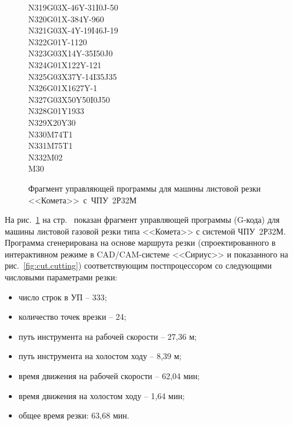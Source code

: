 \begin{figure}
\begin{multicols}{3}
    N319G03X-46Y-31I0J-50 \\
    N320G01X-384Y-960 \\
    N321G03X-4Y-19I46J-19 \\
    N322G01Y-1120 \\
    N323G03X14Y-35I50J0 \\
    N324G01X122Y-121  \\
    N325G03X37Y-14I35J35  \\
    N326G01X1627Y-1 \\
    N327G03X50Y50I0J50  \\
    N328G01Y1933  \\
    N329X20Y30  \\
    N330M74T1 \\
    N331M75T1 \\
    N332M02 \\
    M30
  \end{multicols}
  \caption{
    Фрагмент управляющей программы
    для машины листовой резки <<Комета>>~с~ЧПУ~2Р32М
  }
  \label{fig:cut.control-program}
\end{figure}

На рис.~\ref{fig:cut.control-program}
на стр.~\pageref{fig:cut.control-program}
показан фрагмент управляющей программы
(G-кода) для машины листовой газовой резки
типа <<Комета>> с системой ЧПУ~2Р32М.
Программа сгенерирована на основе маршрута резки
(спроектированного в интерактивном режиме в
CAD/CAM-системе <<Сириус>>
и показанного на рис.~\ref{fig:cut.cutting})
соответствующим постпроцессором со
следующими числовыми параметрами резки:
\begin{itemize}
  \item	число строк в УП – 333;
  \item	количество точек врезки – 24;
  \item	путь инструмента на рабочей скорости – 27,36 м;
  \item	путь инструмента на холостом ходу – 8,39 м;
  \item	время движения на рабочей скорости – 62,04 мин;
  \item	время движения на холостом ходу – 1,64 мин;
  \item	общее время резки: 63,68 мин.
\end{itemize}

